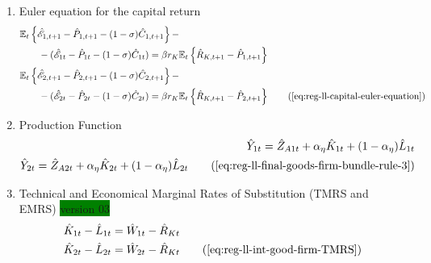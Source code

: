 \documentclass[../thesis.tex]{subfiles}
\begin{document}
{\begin{enumerate}
		\item Euler equation for the capital return
		\begin{alignat}{2}
			&\E \left\{ \hat{\mathscr{E}}_{1, t+1} - \hat{P}_{1, t+1}  - (1 -\sigma) \hat{C}_{1, t+1} \right\} - \nonumber \\ &\qquad - (\hat{\mathscr{E}}_{1 t} - \hat{P}_{1 t} - (1 -\sigma) \hat{C}_{1 t}) = \beta r_{K} \mathbb{E}_t \left\{ \hat{R}_{K, t+1} - \hat{P}_{1, t+1} \right\} \nonumber \\
			&\E \left\{ \hat{\mathscr{E}}_{2, t+1} - \hat{P}_{2, t+1}  - (1 -\sigma) \hat{C}_{2, t+1} \right\} - \nonumber \\ &\qquad - (\hat{\mathscr{E}}_{2 t} - \hat{P}_{2 t} - (1 -\sigma) \hat{C}_{2 t}) = \beta r_{K} \mathbb{E}_t \left\{ \hat{R}_{K, t+1} - \hat{P}_{2, t+1} \right\} \tag{\ref{eq:reg-ll-capital-euler-equation}}
		\end{alignat}
		
		\item Production Function
		\begin{align}
			\hat{Y}_{1 t} = \hat{Z}_{A1 t} + {\alpha_{\eta}} \hat{K}_{1 t} + (1-{\alpha_{\eta}}) \hat{L}_{1 t} \nonumber \\
			\hat{Y}_{2 t} = \hat{Z}_{A2 t} + {\alpha_{\eta}} \hat{K}_{2 t} + (1-{\alpha_{\eta}}) \hat{L}_{2 t} \tag{\ref{eq:reg-ll-final-goods-firm-bundle-rule-3}}
		\end{align}

		\item Technical and Economical Marginal Rates of Substitution (TMRS and EMRS) \colorbox{green}{version 03}
		\begin{align}
			\hat{K}_{1 t} - \hat{L}_{1 t} &= \hat{W}_{1 t} - \hat{R}_{K t} \\
			\hat{K}_{2 t} - \hat{L}_{2 t} &= \hat{W}_{2 t} - \hat{R}_{K t} \tag{\ref{eq:reg-ll-int-good-firm-TMRS}}
		\end{align}

\begin{comment}
	
	\item Capital and Labor Levels \colorbox{orange}{version 02}
	\begin{align}
		\hat{K}_{1t} - \hat{L}_{1t} &= \hat{K}_{2t} - \hat{L}_{2t} \tag{\ref{eq:reg-ll-int-good-firm-TMRS-b}}
	\end{align}
	
\end{comment}



\end{enumerate}}
\end{document}
